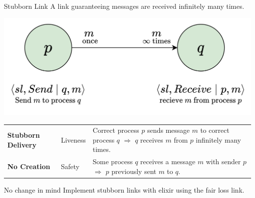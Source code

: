 \begin{definitionbox}{Stubborn Link}
    A link guaranteeing messages are received infinitely many times.
    \begin{center}
        \includegraphics[width=.6\textwidth]{reliable_broadcast/images/stubborn_links.drawio.png}
    \end{center}
    \begin{center}
        \begin{tabular}{l l p{}}
            \textbf{Stubborn Delivery} & Liveness & Correct process $p$ sends message $m$ to correct process $q$ $\Rightarrow$ $q$ receives $m$ from $p$ infinitely many times. \\
            \textbf{No Creation} & Safety & Some process $q$ receives a message $m$ with sender $p$ $\Rightarrow$ $p$ previously sent $m$ to $q$. \\
        \end{tabular}
    \end{center}
\end{definitionbox}

\begin{examplebox}{No change in mind}
    Implement stubborn links with elixir using the fair loss link.
    \tcblower
    
\end{examplebox}

